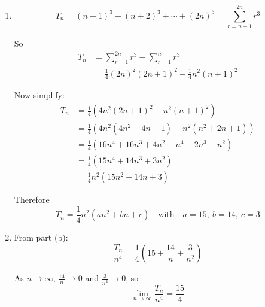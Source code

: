 \documentclass[leqno]{article}
\begin{document}
\begin{enumerate}[
  label=\textbf{\arabic*.},
  leftmargin=*,
  topsep=0pt,
  partopsep=0pt,
  parsep=0pt
]
\begin{djsSolution}
\begin{enumerate}[label=\textbf{(\alph*)}]
we get
\begin{align*}
8\sum_{r=1}^n r^3
&=(n+1)^4+n^4-1-8\left(\frac12 n(n+1)\right)\\
&=(n+1)^4+n^4-1-4n(n+1)\\
&=\left(n^4+4n^3+6n^2+4n+1\right)+n^4-1-4n^2-4n\\
&=2n^4+4n^3+2n^2\\
&=2n^2(n+1)^2
\end{align*}

So
\[
\sum_{r=1}^n r^3=\frac{2n^2(n+1)^2}{8}=\frac14 n^2(n+1)^2
\]

  \item
\[
T_n=(n+1)^3+(n+2)^3+\cdots+(2n)^3=\sum_{r=n+1}^{2n} r^3
\]

So
\begin{align*}
T_n
&=\sum_{r=1}^{2n} r^3-\sum_{r=1}^{n} r^3\\
&=\frac14(2n)^2(2n+1)^2-\frac14 n^2(n+1)^2
\end{align*}

Now simplify:
\begin{align*}
T_n
&=\frac14\left(4n^2(2n+1)^2-n^2(n+1)^2\right)\\
&=\frac14\left(4n^2(4n^2+4n+1)-n^2(n^2+2n+1)\right)\\
&=\frac14\left(16n^4+16n^3+4n^2-n^4-2n^3-n^2\right)\\
&=\frac14\left(15n^4+14n^3+3n^2\right)\\
&=\frac14 n^2(15n^2+14n+3)
\end{align*}

Therefore
\[
T_n=\frac14 n^2(an^2+bn+c)
\quad\text{with}\quad
a=15,\ b=14,\ c=3
\]

  \item From part (b):
\[
\frac{T_n}{n^4}
=\frac14\left(15+\frac{14}{n}+\frac{3}{n^2}\right)
\]

As $n\to\infty$, $\frac{14}{n}\to 0$ and $\frac{3}{n^2}\to 0$, so
\[
\lim_{n\to\infty}\frac{T_n}{n^4}=\frac{15}{4}
\]
\end{enumerate}
\end{djsSolution}


\newpage

\questionitem


\end{enumerate}
\end{document}
